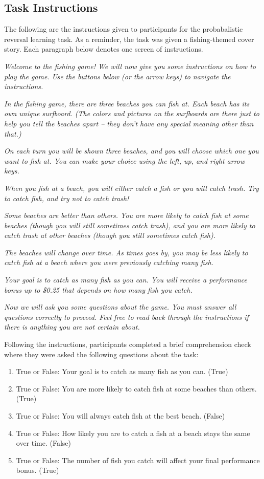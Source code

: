 \documentclass[a4paper,notitlepage,12pt]{article}
\begin{document}
\subsection{Task Instructions}

The following are the instructions given to participants for the probabalistic reversal learning task. As a reminder, the task was given a fishing-themed cover story. Each paragraph below denotes one screen of instructions.

\textit{Welcome to the fishing game! We will now give you some instructions on how to play the game. Use the buttons below (or the arrow keys) to navigate the instructions.}

\textit{In the fishing game, there are three beaches you can fish at. Each beach has its own unique surfboard. (The colors and pictures on the surfboards are there just to help you tell the beaches apart – they don’t have any special meaning other than that.)}

\textit{On each turn you will be shown three beaches, and you will choose which one you want to fish at. You can make your choice using the left, up, and right arrow keys.}

\textit{When you fish at a beach, you will either catch a fish or you will catch trash. Try to catch fish, and try not to catch trash!}

\textit{Some beaches are better than others. You are more likely to catch fish at some beaches (though you will still sometimes catch trash), and you are more likely to catch trash at other beaches (though you still sometimes catch fish).}

\textit{The beaches will change over time. As times goes by, you may be less likely to catch fish at a beach where you were previously catching many fish.}

\textit{Your goal is to catch as many fish as you can. You will receive a performance bonus up to \$0.25 that depends on how many fish you catch.}

\textit{Now we will ask you some questions about the game. You must answer all questions correctly to proceed. Feel free to read back through the instructions if there is anything you are not certain about.}

Following the instructions, participants completed a brief comprehension check where they were asked the following questions about the task:

\begin{enumerate}
    \item True or False: Your goal is to catch as many fish as you can. (True)
    \item True or False: You are more likely to catch fish at some beaches than others. (True)
    \item True or False: You will always catch fish at the best beach. (False)
    \item True or False: How likely you are to catch a fish at a beach stays the same over time. (False)
    \item True or False: The number of fish you catch will affect your final performance bonus. (True)
\end{enumerate}
\end{document}
